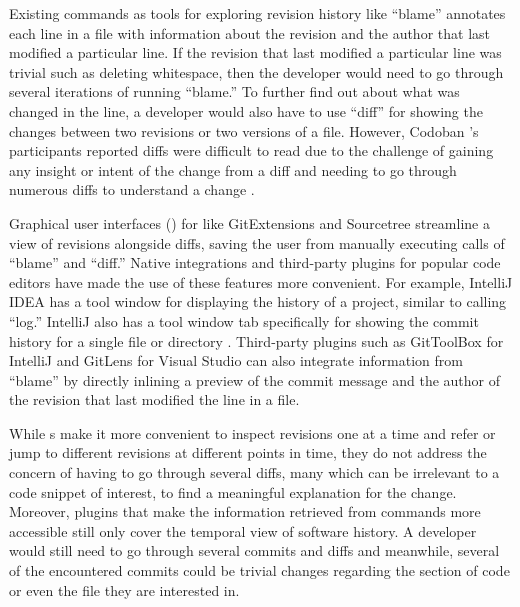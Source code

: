 Existing  commands as tools for exploring revision history like ``blame'' \cite{gitblame} annotates each line in a file with information about the revision and the author that last modified a particular line.
If the revision that last modified a particular line was trivial such as deleting whitespace, then the developer would need to go through several iterations of running ``blame.''
To further find out about what was changed in the line, a developer would also have to use  ``diff'' \cite{gitdiff} for showing the changes between two revisions or two versions of a file.
However, Codoban \etal's participants reported diffs were difficult to read due to the challenge of gaining any insight or intent of the change from a diff and needing to go through numerous diffs to understand a change \cite{codoban_software_2015}.

Graphical user interfaces () for  like GitExtensions \cite{gitextensions} and Sourcetree \cite{sourcetree} streamline a view of revisions alongside diffs, saving the user from manually executing calls of  ``blame'' and ``diff.'' 
Native  integrations and third-party plugins for popular code editors have made the use of these  features more convenient. 
For example, IntelliJ IDEA \cite{intellij} has a tool window for displaying the  history of a project, similar to calling  ``log.''
IntelliJ also has a tool window tab specifically for showing the commit history for a single file or directory \cite{intellij-showhistory}.
Third-party plugins such as GitToolBox \cite{gittoolbox} for IntelliJ and GitLens \cite{gitlens} for Visual Studio can also integrate information from  ``blame'' by directly inlining a preview of the commit message and the author of the revision that last modified the line in a file.

While s make it more convenient to inspect revisions one at a time and refer or jump to different revisions at different points in time, they do not address the concern of having to go through several diffs, many which can be irrelevant to a code snippet of interest, to find a meaningful explanation for the change.
Moreover, plugins that make the information retrieved from  commands more accessible still only cover the temporal view of software history.
A developer would still need to go through several commits and diffs and meanwhile, several of the encountered commits could be trivial changes regarding the section of code or even the file they are interested in.

